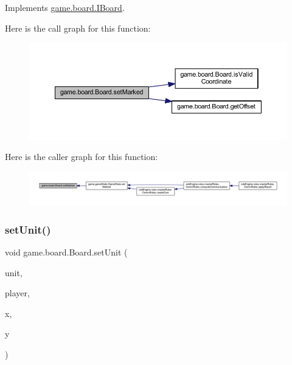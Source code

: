 Implements \mbox{\hyperlink{interfacegame_1_1board_1_1_i_board_a334f717410bd56a0112a70ce2a832c93}{game.\+board.\+I\+Board}}.

Here is the call graph for this function\+:
\nopagebreak
\begin{figure}[H]
\begin{center}
\leavevmode
\includegraphics[width=350pt]{classgame_1_1board_1_1_board_a22008b95ac8e2754713eaebac4622ac4_cgraph}
\end{center}
\end{figure}
Here is the caller graph for this function\+:
\nopagebreak
\begin{figure}[H]
\begin{center}
\leavevmode
\includegraphics[width=350pt]{classgame_1_1board_1_1_board_a22008b95ac8e2754713eaebac4622ac4_icgraph}
\end{center}
\end{figure}
\mbox{\label{classgame_1_1board_1_1_board_a9432da1a143c35864052234c09acec09}} 
\subsubsection{\texorpdfstring{set\+Unit()}{setUnit()}}
{\footnotesize\ttfamily void game.\+board.\+Board.\+set\+Unit (\begin{DoxyParamCaption}\item[{\mbox{\hyperlink{enumrule_engine_1_1entity_1_1_e_unit_property}{E\+Unit\+Property}}}]{unit,  }\item[{\mbox{\hyperlink{enumgame_1_1_e_player}{E\+Player}}}]{player,  }\item[{int}]{x,  }\item[{int}]{y }\end{DoxyParamCaption})\hspace{0.3cm}{\ttfamily [inline]}}


